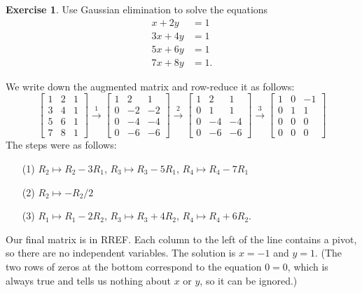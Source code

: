 \documentclass[a4paper]{book}
\newcommand{\xra}       {\xrightarrow}
\renewcommand{\:}{\colon}
\theoremstyle{definition}
\newtheorem{exercise}[theorem]{Exercise}
\renewenvironment{solution}{\SolutionInline}{\endSolutionInline}
\begin{document}
\begin{exercise}
 Use Gaussian elimination to solve the equations
 \begin{align*}
  x  + 2y &= 1 \\
  3x + 4y &= 1 \\
  5x + 6y &= 1 \\
  7x + 8y &= 1.
 \end{align*}
\end{exercise}
\begin{solution}
 We write down the augmented matrix and row-reduce it as follows:
 {\small \[
  \left[\begin{array}{cc|c}
    1 &  2 &  1 \\
    3 &  4 &  1 \\
    5 &  6 &  1 \\
    7 &  8 &  1 
  \end{array}\right]
  \xra{1}
  \left[\begin{array}{cc|c}
    1 &  2 &  1 \\
    0 & -2 & -2 \\
    0 & -4 & -4 \\
    0 & -6 & -6 
  \end{array}\right]
  \xra{2}
  \left[\begin{array}{cc|c}
    1 &  2 &  1 \\
    0 &  1 &  1 \\
    0 & -4 & -4 \\
    0 & -6 & -6 
  \end{array}\right]
  \xra{3}
  \left[\begin{array}{cc|c}
    1 &  0 & -1 \\
    0 &  1 &  1 \\
    0 &  0 &  0 \\
    0 &  0 &  0 
  \end{array}\right]
 \]}
 The steps were as follows:
 \begin{itemize}
  \item[(1)] $R_2\mapsto R_2-3R_1$, $R_3\mapsto R_3-5R_1$, $R_4\mapsto R_4-7R_1$
  \item[(2)] $R_2\mapsto -R_2/2$
  \item[(3)] $R_1\mapsto R_1-2R_2$, $R_3\mapsto R_3+4R_2$, $R_4\mapsto R_4+6R_2$.
 \end{itemize}
 Our final matrix is in RREF.  Each column to the left of the line
 contains a pivot, so there are no independent variables.  The
 solution is $x=-1$ and $y=1$.  (The two rows of zeros at the bottom
 correspond to the equation $0=0$, which is always true and tells us
 nothing about $x$ or $y$, so it can be ignored.)
\end{solution}
\end{document}
